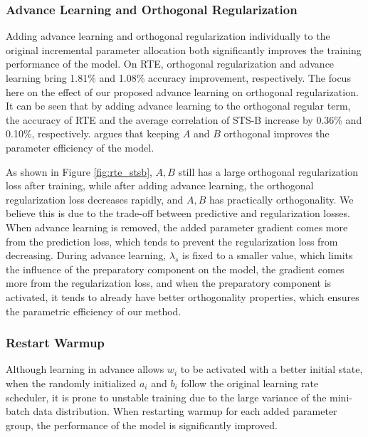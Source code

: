 \subsubsection{Advance Learning and Orthogonal Regularization} Adding advance learning and orthogonal regularization individually to the original incremental parameter allocation both significantly improves the training performance of the model. On RTE, orthogonal regularization and advance learning bring 1.81\% and 1.08\% accuracy improvement, respectively.  The focus here on the effect of our proposed advance learning on orthogonal regularization. It can be seen that by adding advance learning to the orthogonal regular term, the accuracy of RTE and the average correlation of STS-B increase by 0.36\% and 0.10\%, respectively. \citet{peft:adalora} argues that keeping $A$ and $B$ orthogonal improves the parameter efficiency of the model. 

As shown in Figure \ref{fig:rte_stsb}, $A,B$ still has a large orthogonal regularization loss after training, while after adding advance learning, the orthogonal regularization loss decreases rapidly, and $A,B$ has practically orthogonality. We believe this is due to the trade-off between predictive and regularization losses. When advance learning is removed, the added parameter gradient comes more from the prediction loss, which tends to prevent the regularization loss from decreasing. During advance learning, $\lambda _s$ is fixed to a smaller value, which limits the influence of the preparatory component on the model, the gradient comes more from the regularization loss, and when the preparatory component is activated, it tends to already have better orthogonality properties, which ensures the parametric efficiency of our method.

\subsubsection{Restart Warmup} Although learning in advance allows $w_i$ to be activated with a better initial state, when the randomly initialized $a_i$ and $b_i$ follow the original learning rate scheduler, it is prone to unstable training due to the large variance of the mini-batch data distribution\cite{e:7}. When restarting warmup for each added parameter group, the performance of the model is significantly improved.

